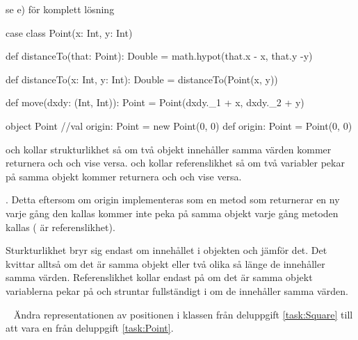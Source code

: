 \SubtaskSolved  se e) för komplett lösning

\SubtaskSolved  \begin{CodeSmall}
case class Point(x: Int, y: Int) {

	def distanceTo(that: Point): Double = math.hypot(that.x - x, that.y -y)

	def distanceTo(x: Int, y: Int): Double = distanceTo(Point(x, y))

	def move(dxdy: (Int, Int)): Point = Point(dxdy._1 + x, dxdy._2 + y)
}

object Point {
	//val origin: Point = new Point(0, 0)
	def origin: Point = Point(0, 0)
}
\end{CodeSmall}

\SubtaskSolved  \code{==} och \code{!=} kollar strukturlikhet så om två objekt innehåller samma värden kommer \code{==} returnera  och \code{!=}  och vise versa.  och  kollar referenslikhet så om två variabler pekar på samma objekt kommer  returnera  och   och vise versa.

\SubtaskSolved  {}. Detta eftersom om origin implementeras som en metod som returnerar en ny  varje gång den kallas kommer  inte peka på samma objekt varje gång metoden kallas ( är referenslikhet).

\SubtaskSolved  Sturkturlikhet bryr sig endast om innehållet i objekten och jämför det. Det kvittar alltså om det är samma objekt eller två olika så länge de innehåller samma värden. Referenslikhet kollar endast på om det är samma objekt variablerna pekar på och struntar fullständigt i om de innehåller samma värden.


\QUESTEND









\QUESTBEGIN

\Task \label{task:PointSquare} \what~ Ändra representationen av positionen i klassen  från deluppgift \ref{task:Square} till att vara en  från deluppgift \ref{task:Point}.


\SOLUTION


